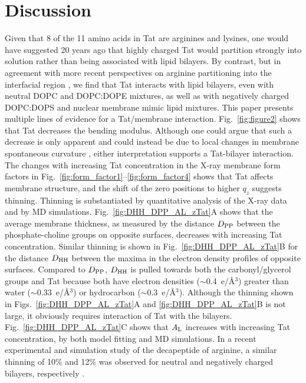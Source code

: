 

\section{Discussion}\label{sec:discussion}
Given that 8 of the 11 amino acids in Tat are arginines and lysines, 
one would have
suggested 20 years ago that highly charged Tat would partition strongly into 
solution rather than
being associated with lipid bilayers. By contrast, but in agreement with more 
recent perspectives
on arginine partitioning into the interfacial region \cite{Johansson09}, 
we find that Tat interacts with lipid bilayers, even with neutral DOPC and 
DOPC:DOPE mixtures, as well as with negatively
charged DOPC:DOPS and nuclear membrane mimic lipid mixtures. 
This paper presents multiple lines of evidence for a Tat/membrane interaction. 
Fig.~\ref{fig:figure2} shows that Tat decreases the bending modulus. 
Although one could argue that such a decrease is only apparent 
and could instead be due to local changes in membrane spontaneous curvature 
\cite{Tristram-Nagle07_BPJ}, either interpretation supports a Tat-bilayer 
interaction. The changes with increasing Tat concentration in the X-ray
membrane form factors in Fig.~\ref{fig:form_factor1}--\ref{fig:form_factor4} 
shows that Tat affects 
membrane structure, and the shift of the zero positions to higher $q_z$ 
suggests thinning. Thinning is substantiated by quantitative analysis
of the X-ray data and by MD simulations. 
Fig.~\ref{fig:DHH_DPP_AL_zTat}A shows that the average membrane thickness, 
as measured by the distance $D_\textrm{PP}$ between the phosphate-choline groups on opposite surfaces, 
decreases with increasing Tat concentration. 
Similar thinning is shown in Fig.~\ref{fig:DHH_DPP_AL_zTat}B for the distance 
$D_\textrm{HH}$ between the maxima in the electron density profiles of opposite surfaces.  
Compared to $D_\textrm{PP}$, $D_\textrm{HH}$ is 
pulled towards both the carbonyl/glycerol groups and Tat because both have 
electron densities ($\sim$0.4~e/\AA$^3$) greater than water ($\sim$0.33~e/\AA$^3$) or 
hydrocarbon ($\sim$0.3~e/\AA$^3$). 
Although the thinning shown in Figs.~\ref{fig:DHH_DPP_AL_zTat}A 
and \ref{fig:DHH_DPP_AL_zTat}B
is not large, it obviously requires interaction of Tat with the bilayers. 
Fig.~\ref{fig:DHH_DPP_AL_zTat}C shows that $A_\textrm{L}$ increases with increasing 
Tat concentration, by both model fitting and MD simulations.
In a recent experimental and simulation study of the decapeptide of arginine, 
a similar thinning of 10\% and 12\% was observed for neutral and negatively charged 
bilayers, respectively \cite{Vazdar13}.

